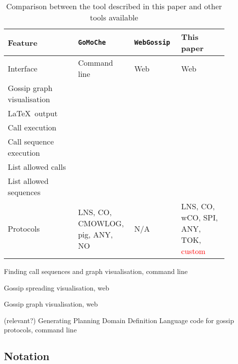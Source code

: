 \begin{table*}
    \centering
    \caption{Comparison between the tool described in this paper and other tools available}
    \label{tab:tool-comparison}
    \begin{tabular}{@{}p{0.3\linewidth}*{3}{M{0.2\linewidth}}@{}}
        \toprule
        Feature 
            & \texttt{GoMoChe} 
            & \texttt{WebGossip} 
            & This paper\\
        \midrule
        Interface
            & Command line
            & Web
            & Web
            \\
        Gossip graph visualisation
            & 
            & 
            & 
            \\
        \LaTeX\ output
            & 
            & 
            & 
            \\
        Call execution
            & 
            & 
            & 
            \\
        Call sequence execution
            & 
            & 
            & 
            \\
        List allowed calls
            & 
            & 
            & 
            \\
        List allowed sequences
            & 
            & 
            & 
            \\
        Protocols
            & LNS, CO, CMOWLOG, pig, ANY, NO
            & N/A
            & LNS, CO, wCO, SPI, ANY, TOK, \textcolor{red}{custom}
            \\
        \bottomrule
    \end{tabular}
\end{table*}

Finding call sequences and graph visualisation, command line \parencite{gattinger_m4lvingomoche_2020}

Gossip spreading visualisation, web \parencite{moelker_rrmoelkergossip-visualization_2016}

Gossip graph visualisation, web \parencite{gattinger_webgossip_nodate}

(relevant?) Generating Planning Domain Definition Language code for gossip protocols, command line \parencite{maffre_faustinemaffregossipproblem-pddl-generator_2020}

\subsection{Notation}
\label{sec:notation}


